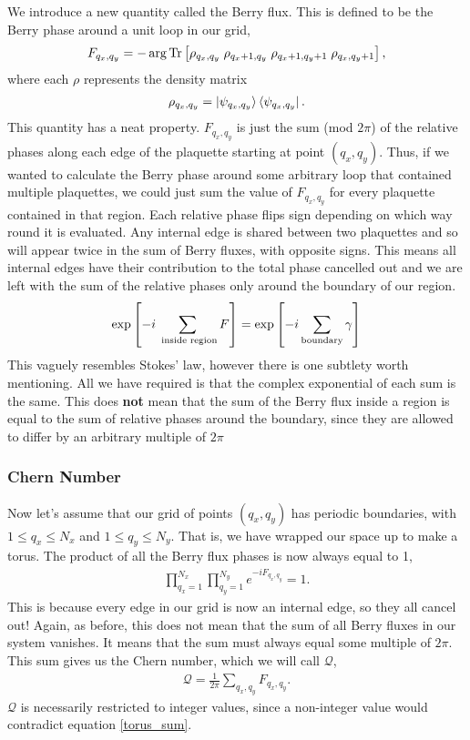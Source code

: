 We introduce a new quantity called the Berry flux. This is defined to be the Berry phase around a unit loop in our grid,
\begin{align}\label{eqn:berry_flux}
    F_{q_x,q_y} =  - \arg \textup{Tr} \left[ \rho_{q_x,q_y} \;\rho_{q_x+1,q_y} \;\rho_{q_x+1,q_y+1} \;\rho_{q_x,q_y+1} \right ],
\end{align}
where each $\rho$ represents the density matrix
\begin{align}
    \rho_{q_x,q_y} = \ket{\psi_{q_x,q_y}}\bra{\psi_{q_x,q_y}}.
\end{align}
This quantity has a neat property. $F_{q_x,q_y}$ is just the sum (mod $2\pi$) of the relative phases along each edge of the plaquette starting at point $(q_x,q_y)$. Thus, if we wanted to calculate the Berry phase around some arbitrary loop that contained multiple plaquettes, we could just sum the value of $ F_{q_x,q_y} $ for every plaquette contained in that region. Each relative phase flips sign depending on which way round it is evaluated. Any internal edge is shared between two plaquettes and so will appear twice in the sum of Berry fluxes, with opposite signs. This means all internal edges have their contribution to the total phase cancelled out and we are left with the sum of the relative phases only around the boundary of our region.
\begin{align}\label{berry_sum_discrete}
     \exp \left[ {-i \sum_{\textup{ inside region}}F}\right ] = \exp\left [ -i\sum_{\textup{boundary}} \gamma\right ]
\end{align}
This vaguely resembles Stokes' law, however there is one subtlety worth mentioning. All we have required is that the complex exponential of each sum is the same. This does \textbf{not} mean that the sum of the Berry flux inside a region is equal to the sum of relative phases around the boundary, since they are allowed to differ by an arbitrary multiple of $2\pi$


\subsubsection{Chern Number} \label{sec:discrete_chern}
Now let's assume that our grid of points $(q_x,q_y)$ has periodic boundaries, with $1\leq q_x \leq N_x$ and $1 \leq q_y \leq N_y$. That is, we have wrapped our space up to make a torus. The product of all the Berry flux phases is now always equal to 1,
\begin{align}\label{torus_sum}
    \prod_{q_x=1}^{N_x}\prod_{q_y=1}^{N_y}e^{-i F_{q_x,q_y}} = 1.
\end{align}
This is because every edge in our grid is now an internal edge, so they all cancel out! Again, as before, this does not mean that the sum of all Berry fluxes in our system vanishes. It means that the sum must always equal some multiple of $2\pi$. This sum gives us the Chern number, which we will call $\mathcal Q$,
\begin{align}\label{eqn:discrete_chern_number}
    \mathcal Q = \frac{1}{2\pi} \sum_{q_x,q_y}F_{q_x,q_y}.
\end{align}
$\mathcal Q$ is necessarily restricted to integer values, since a non-integer value would contradict equation \ref{torus_sum}.\par


